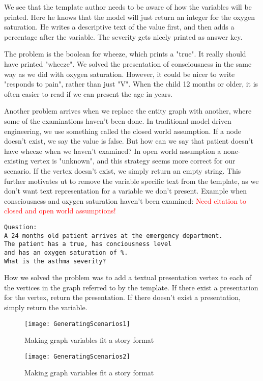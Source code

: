 We see that the template author needs to be aware of how the variables will be printed. Here he knows that the model will just return an integer for the oxygen saturation. He writes a descriptive text of the value first, and then adds a percentage after the variable. The severity gets nicely printed as answer key.

The problem is the boolean for wheeze, which prints a "true". It really should have printed "wheeze". We solved the presentation of consciousness in the same way as we did with oxygen saturation. However, it could be nicer to write "responds to pain", rather than just "V". When the child 12 months or older, it is often easier to read if we can present the age in years.

Another problem arrives when we replace the entity graph with another, where some of the examinations haven't been done. In traditional model driven engineering, we use something called the closed world assumption. If a node doesn't exist, we say the value is false. But how can we say that patient doesn't have wheeze when we haven't examined? In open world assumption a none-existing vertex is "unknown", and this strategy seems more correct for our scenario. If the vertex doesn't exist, we simply return an empty string. This further motivates ut to remove the variable specific text from the template, as we don't want text representation for a variable we don't present. Example when consciousness and oxygen saturation haven't been examined:
\textcolor{red}{Need citation to closed and open world assumptions!}

\begin{verbatim}
Question:
A 24 months old patient arrives at the emergency department. 
The patient has a true, has conciousness level 
and has an oxygen saturation of %. 
What is the asthma severity? 
\end{verbatim}

How we solved the problem was to add a textual presentation vertex to each of the vertices in the graph referred to by the template. If there exist a presentation for the vertex, return the presentation. If there doesn't exist a presentation, simply return the variable.

\begin{figure}[h!]
	\caption {Making graph variables fit a story format}
	\label{fig:GeneratingScenarios1}
	\texttt{[image: GeneratingScenarios1]}
\end{figure}

\begin{figure}[h!]
	\caption {Making graph variables fit a story format}
	\label{fig:GeneratingScenarios2}
	\texttt{[image: GeneratingScenarios2]}
\end{figure}

